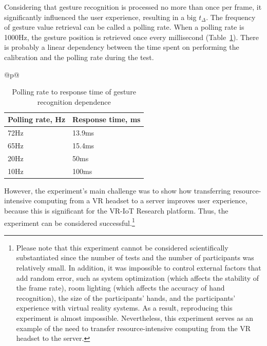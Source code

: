 Considering that gesture recognition is processed no more than once per frame, it significantly influenced the user experience, resulting in a big $t_{\Delta}$. The frequency of gesture value retrieval can be called a polling rate. When a polling rate is 1000Hz, the gesture position is retrieved once every millisecond (Table~\ref{tab:polling-rate-table}). There is probably a linear dependency between the time spent on performing the calibration and the polling rate during the test.

\begin{table}
\let\TPToverlap=\TPTrlap
  \centering
  \begin{threeparttable}[c]
    \caption{Polling rate to response time of gesture recognition dependence}
    \label{tab:polling-rate-table}
    \begin{tabular}{@{}p{\textwidth}@{}}
    \centering
    \begin{tabular}{ll}
      \toprule
      Polling rate, Hz    & Response time, ms                 \\
      \midrule
      72Hz & 13.9ms \\
      65Hz & 15.4ms \\
      20Hz & 50ms \\
      10Hz & 100ms \\
      \bottomrule
    \end{tabular}
    \end{tabular}
  \end{threeparttable}
\end{table}

However, the experiment's main challenge was to show how transferring resource-intensive computing from a VR headset to a server improves user experience, because this is significant for the VR-IoT Research platform. Thus, the experiment can be considered successful.\footnote{Please note that this experiment cannot be considered scientifically substantiated since the number of tests and the number of participants was relatively small. In addition, it was impossible to control external factors that add random error, such as system optimization (which affects the stability of the frame rate), room lighting (which affects the accuracy of hand recognition), the size of the participants' hands, and the participants' experience with virtual reality systems. As a result, reproducing this experiment is almost impossible. Nevertheless, this experiment serves as an example of the need to transfer resource-intensive computing from the VR headset to the server.}


